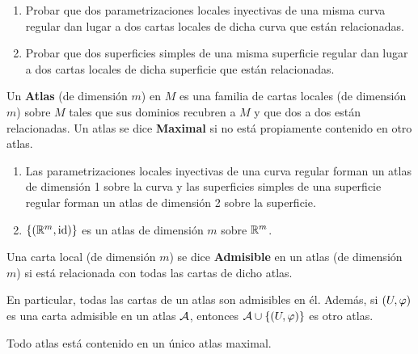 \documentclass[cursovd_portada.tex]{subfiles}
\begin{document}
\begin{ej}
{\rm
\begin{enumerate}
\item Probar que dos parametrizaciones locales inyectivas de una
misma curva regular dan lugar a dos cartas locales de dicha curva
que est\'{a}n relacionadas. \item Probar que dos superficies
simples de una misma superficie regular dan lugar a dos cartas
locales de dicha superficie que est\'{a}n relacionadas.
\end{enumerate}}
\end{ej}
\begin{defi}
Un {\bf Atlas} (de dimensi\'{o}n $m$) en $M$ es una familia de cartas locales (de dimensi\'{o}n $m$) sobre $M$ tales que
sus dominios recubren a $M$ y que dos a dos est\'{a}n relacionadas. Un atlas se dice {\bf Maximal} si no est\'{a}
propiamente contenido en otro atlas.
\end{defi}
\begin{ej}
{\rm
\begin{enumerate}
\item Las parametrizaciones locales inyectivas de una curva regular forman un atlas de dimensi\'{o}n 1 sobre la curva y las
superficies simples de una superficie regular forman un atlas de dimensi\'{o}n 2 sobre la superficie.
\item $\{(\mathbb{R}^m,{\rm id})\}$ es un atlas de dimensi\'{o}n $m$ sobre $\mathbb{R}^m$.
\end{enumerate}}
\end{ej}
\begin{defi}
Una carta local (de dimensi\'{o}n $m$) se dice {\bf Admisible} en un atlas (de dimensi\'{o}n $m$) si est\'{a} relacionada con
todas las cartas de dicho atlas.
\end{defi}
En particular, todas las cartas de un atlas son admisibles en \'{e}l. Adem\'{a}s, si $(U,\varphi)$ es una carta admisible en
un atlas ${\cal A}$, entonces ${\cal A}\cup\{(U,\varphi)\}$ es otro atlas.
\begin{prop}
Todo atlas est\'{a} contenido en un \'{u}nico atlas maximal.
\end{prop}
\end{document}
